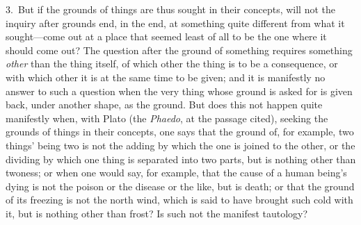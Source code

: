 \documentclass[12pt,a4paper]{book}
\begin{document}
3.~But if the grounds of things are thus sought in their concepts, will not the
inquiry after grounds end, in the end, at something quite different from what it
sought---come out at a place that seemed least of all to be the one where it should
come out? The question after the ground of something requires something \emph{other}
than the thing itself, of which other the thing is to be a consequence, or with
which other it is at the same time to be given; and it is manifestly no answer to
such a question when the very thing whose ground is asked for is given back, under
another shape, as the ground. But does this not happen quite manifestly when, with
Plato (the \textit{Phaedo}, at the passage cited), seeking the grounds of things in
their concepts, one says that the ground of, for example, two things' being two is
not the adding by which the one is joined to the other, or the dividing by which one
thing is separated into two parts, but is nothing other than twoness; or when one
would say, for example, that the cause of a human being's dying is not the poison or
the disease or the like, but is death; or that the ground of its freezing is not the
north wind, which is said to have brought such cold with it, but is nothing other
than frost? Is such not the manifest tautology?
\end{document}
